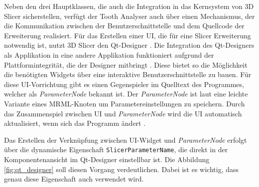 Neben den drei Hauptklassen, die auch die Integration in das Kernsystem von 3D Slicer
sicherstellen, verfügt der Tooth Analyser auch über einen Mechanismus, der die Kommunikation
zwischen der Benutzerschnittstelle und dem Quellcode der Erweiterung realisiert.
Für das Erstellen einer \ac{UI}, die für eine Slicer Erweiterung notwendig ist, nutzt
3D Slicer den Qt-Designer \citep[vgl.][]{qt2024}. Die Integration des Qt-Designers
als Applikation in eine andere Applikation funktioniert aufgrund der Plattformintegrität,
die der Designer mitbringt \citep[vgl.][]{qt2024}. Diese bietet so die
Möglichkeit die benötigten Widgets über eine interaktive Benutzerschnittstelle
zu bauen. Für diese \ac{UI}-Vorrichtung gibt es einen Gegenspieler im Quelltext
des Programmes, welcher als \textit{ParameterNode} bekannt ist. Der \textit{ParameterNode}
ist laut \citet{slicer2024} eine leichte Variante eines \ac{MRML}-Knoten um
Parametereinstellungen zu speichern. Durch das Zusammenspiel zwischen \ac{UI}
und \textit{ParameterNode} wird die \ac{UI} automatisch aktualisiert, wenn sich das
Programm ändert \citep[vgl.][]{slicer2024}.

Das Erstellen der Verknüpfung zwischen \ac{UI}-Widget und \textit{ParameterNode}
erfolgt über die dynamische Eigenschaft \texttt{SlicerParameterName}, die direkt
in der Komponentenansicht im Qt-Designer einstellbar ist. Die Abbildung \ref{fig:qt_designer}
soll diesen Vorgang verdeutlichen. Dabei ist es wichtig, dass genau diese Eigenschaft
auch verwendet wird.

